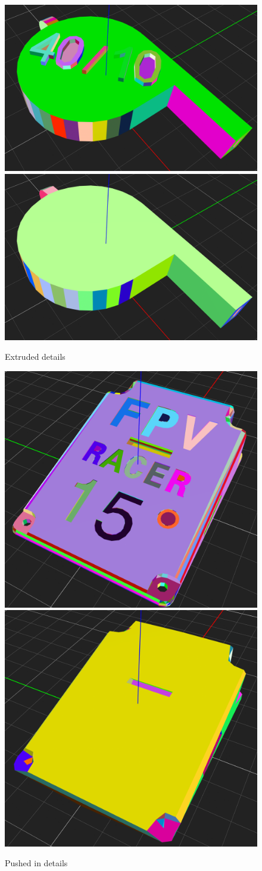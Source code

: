 \documentclass[../ClassicThesis.tex]{subfiles}
\begin{document}
\begin{figure}
\includegraphics[width=0.5\columnwidth]{Images/04-approx-welding-beveled-extruded.png}
\includegraphics[width=0.5\columnwidth]{Images/04-approx-welding-beveled-extruded-result.png}
\caption{Extruded details}
\label{fig:extruded_details}
\end{figure}

\begin{figure}
\includegraphics[width=0.5\columnwidth]{Images/04-approx-welding-pushedIn.png}
\includegraphics[width=0.5\columnwidth]{Images/04-approx-welding-pushedIn-result.png}
\caption{Pushed in details}
\label{fig:pushed_in_details}
\end{figure}
\end{document}

